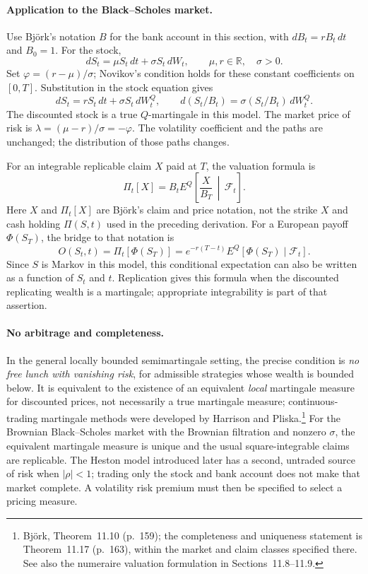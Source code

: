 \paragraph*{Application to the Black--Scholes market.}
Use Bj\"ork's notation $B$ for the bank account in this section, with $dB_t=rB_t\,dt$ and $B_0=1$.
For the stock,
\[
 dS_t=\mu S_t\,dt+\sigma S_t\,dW_t,
 \qquad \mu,r\in\mathbb R,\quad \sigma>0.
\]
Set $\varphi=(r-\mu)/\sigma$; Novikov's condition holds for these constant coefficients on $[0,T]$.
Substitution in the stock equation gives
\begin{equation}\label{eq:risk-neutral-gbm}
 dS_t=rS_t\,dt+\sigma S_t\,dW_t^Q,
 \qquad d(S_t/B_t)=\sigma(S_t/B_t)\,dW_t^Q.
\end{equation}
The discounted stock is a true $Q$-martingale in this model.
The market price of risk is $\lambda=(\mu-r)/\sigma=-\varphi$.
The volatility coefficient and the paths are unchanged; the distribution of those paths changes.

For an integrable replicable claim $X$ paid at $T$, the valuation formula is
\begin{equation}\label{eq:risk-neutral-price}
 \Pi_t[X]=B_tE^Q\left[\frac{X}{B_T}\,\middle|\,\mathcal F_t\right].
\end{equation}
Here $X$ and $\Pi_t[X]$ are Bj\"ork's claim and price notation, not the strike $X$ and cash holding $\Pi(S,t)$ used in the preceding derivation.
For a European payoff $\Phi(S_T)$, the bridge to that notation is
\[
 O(S_t,t)=\Pi_t[\Phi(S_T)]
 =e^{-r(T-t)}E^Q[\Phi(S_T)\mid\mathcal F_t].
\]
Since $S$ is Markov in this model, this conditional expectation can also be written as a function of $S_t$ and $t$.
Replication gives this formula when the discounted replicating wealth is a martingale; appropriate integrability is part of that assertion.

\paragraph*{No arbitrage and completeness.}
In the general locally bounded semimartingale setting, the precise condition is \emph{no free lunch with vanishing risk}, for admissible strategies whose wealth is bounded below.
It is equivalent to the existence of an equivalent \emph{local} martingale measure for discounted prices, not necessarily a true martingale measure; continuous-trading martingale methods were developed by Harrison and Pliska\cite{HarrisonPliska1981}.\footnote{Bj\"ork\cite{Bjork2020}, Theorem~11.10 (p.~159); the completeness and uniqueness statement is Theorem~11.17 (p.~163), within the market and claim classes specified there.
See also the numeraire valuation formulation in Sections~11.8--11.9.}
For the Brownian Black--Scholes market with the Brownian filtration and nonzero $\sigma$, the equivalent martingale measure is unique and the usual square-integrable claims are replicable.
The Heston model introduced later has a second, untraded source of risk when $|\rho|<1$; trading only the stock and bank account does not make that market complete.
A volatility risk premium must then be specified to select a pricing measure.

